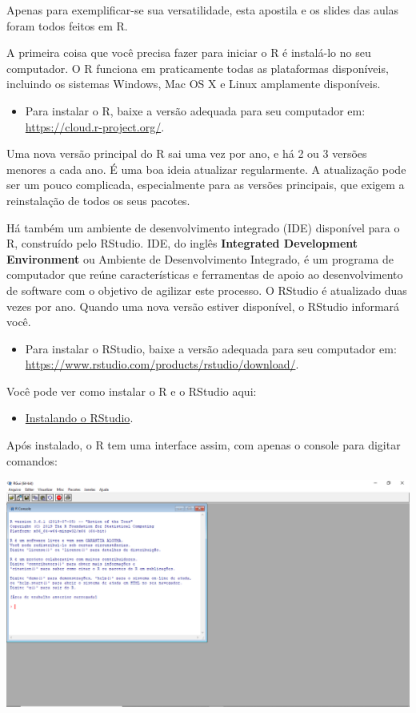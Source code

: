 \documentclass[]{book}
\providecommand{\tightlist}{%
  \setlength{\itemsep}{0pt}\setlength{\parskip}{0pt}}
\begin{document}
Apenas para exemplificar-se sua versatilidade, esta apostila e os slides das aulas foram todos feitos em R.

A primeira coisa que você precisa fazer para iniciar o R é instalá-lo no seu computador. O R funciona em praticamente todas as plataformas disponíveis, incluindo os sistemas Windows, Mac OS X e Linux amplamente disponíveis.

\begin{itemize}
\tightlist
\item
  Para instalar o R, baixe a versão adequada para seu computador em: \url{https://cloud.r-project.org/}.
\end{itemize}

Uma nova versão principal do R sai uma vez por ano, e há 2 ou 3 versões menores a cada ano. É uma boa ideia atualizar regularmente. A atualização pode ser um pouco complicada, especialmente para as versões principais, que exigem a reinstalação de todos os seus pacotes.

Há também um ambiente de desenvolvimento integrado (IDE) disponível para o R, construído pelo RStudio. IDE, do inglês \textbf{Integrated Development Environment} ou Ambiente de Desenvolvimento Integrado, é um programa de computador que reúne características e ferramentas de apoio ao desenvolvimento de software com o objetivo de agilizar este processo. O RStudio é atualizado duas vezes por ano. Quando uma nova versão estiver disponível, o RStudio informará você.

\begin{itemize}
\tightlist
\item
  Para instalar o RStudio, baixe a versão adequada para seu computador em: \url{https://www.rstudio.com/products/rstudio/download/}.
\end{itemize}

Você pode ver como instalar o R e o RStudio aqui:

\begin{itemize}
\tightlist
\item
  \href{https://www.youtube.com/watch?v=orjLGFmx6l4}{Instalando o RStudio}.
\end{itemize}

Após instalado, o R tem uma interface assim, com apenas o console para digitar comandos:

\begin{center}\includegraphics[width=0.9\linewidth]{imagens/r-project} \end{center}
\end{document}

